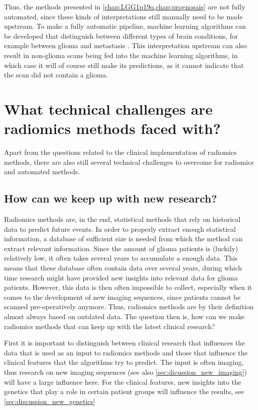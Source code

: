 Thus, the methods presented in \cref{chap:LGG1p19q,chap:prognosais} are not fully automated, since these kinds of interpretations still manually need to be made upstream.
To make a fully automatic pipeline, machine learning algorithms can be developed that distinguish between different types of brain conditions, for example between glioma and metastasis \autocite{chen2019metastatic}.
This interpretation upstream can also result in non-glioma scans being fed into the machine learning algorithms, in which case it will of course still make its predictions, as it cannot indicate that the scan did not contain a glioma.



\section{What technical challenges are radiomics methods faced with?}\label{sec:discussion_technical}
Apart from the questions related to the clinical implementation of radiomics methods, there are also still several technical challenges to overcome for radiomics and automated methods.

\subsection{How can we keep up with new research?}
Radiomics methods are, in the end, statistical methods that rely on historical data to predict future events.
In order to properly extract enough statistical information, a database of sufficient size is needed from which the method can extract relevant information.
Since the amount of glioma patients is (luckily) relatively low, it often takes several years to accumulate a enough data.
This means that these database often contain data over several years, during which time research might have provided new insights into relevant data for glioma patients.
However, this data is then often impossible to collect, especially when it comes to the development of new imaging sequences, since patients cannot be scanned pre-operatively anymore.
Thus, radiomics methods are by their definition almost always based on outdated data.
The question then is, how can we make radiomics methods that can keep up with the latest clinical research?

First it is important to distinguish between clinical research that influences the data that is used as an input to radiomics methods and those that influence the clinical features that the algorithms try to predict.
The input is often imaging, thus research on new imaging sequences (see also \cref{sec:dicussion_new_imaging}) will have a large influence here.
For the clinical features, new insights into the genetics that play a role in certain patient groups will influence the results, see \cref{sec:discussion_new_genetics}


